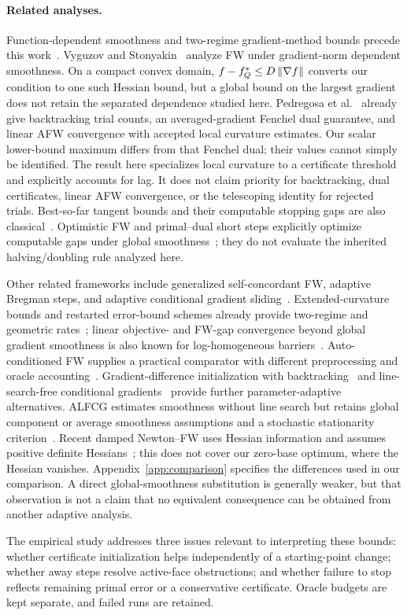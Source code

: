 \paragraph{Related analyses.}
Function-dependent smoothness and two-regime gradient-method bounds
precede this work~\cite{warmup,lobanovkoloskova,lobanov}.
Vyguzov and Stonyakin~\cite{vyguzov} analyze FW under gradient-norm
dependent smoothness. On a compact convex domain,
$f-f_Q^*\le D\left\|\nabla f\right\|$ converts our condition to one such Hessian
bound, but a global bound on the largest gradient does not retain the
separated dependence studied here.
Pedregosa et al.~\cite[Theorems 1, 3, and 4]{pedregosa} already give
backtracking trial counts, an averaged-gradient Fenchel dual guarantee,
and linear AFW convergence with accepted local curvature estimates.
Our scalar lower-bound maximum differs from that Fenchel dual; their
values cannot simply be identified. The result here specializes local
curvature to a certificate threshold and explicitly accounts for lag.
It does not claim priority for backtracking, dual certificates, linear
AFW convergence, or the telescoping identity for rejected trials.
Best-so-far tangent bounds and their computable stopping gaps are
also classical~\cite[Method 1]{freundgrigas}. Optimistic FW and
primal--dual short steps explicitly optimize computable gaps under
global smoothness~\cite[Proposition 4.1]{beyondshort}; they do not
evaluate the inherited halving/doubling rule analyzed here.

Other related frameworks include generalized self-concordant FW,
adaptive Bregman steps, and adaptive conditional gradient
sliding~\cite{selfconcordant,bregmanfw,adcgs}.
Extended-curvature bounds and restarted error-bound schemes already
provide two-regime and geometric rates~\cite{wirth,restartfw};
linear objective- and FW-gap convergence beyond global gradient
smoothness is also known for log-homogeneous barriers~\cite{zhao}.
Auto-conditioned FW supplies a practical comparator with different
preprocessing and oracle accounting~\cite{autoconditioned}.
Gradient-difference initialization with backtracking~\cite{khademi}
and line-search-free conditional gradients~\cite{yagishita}
provide further parameter-adaptive alternatives.
ALFCG estimates smoothness without line search but retains global
component or average smoothness assumptions and a stochastic
stationarity criterion~\cite[Section 3]{alfcg}.
Recent damped Newton--FW uses Hessian information and assumes positive
definite Hessians~\cite[Section 1]{newtonfw}; this does not cover our
zero-base optimum, where the Hessian vanishes.
Appendix~\ref{app:comparison} specifies the differences used in our
comparison. A direct global-smoothness substitution is generally weaker,
but that observation is not a claim that no equivalent consequence
can be obtained from another adaptive analysis.

The empirical study addresses three issues relevant to interpreting
these bounds: whether certificate initialization helps independently of
a starting-point change; whether away steps resolve active-face
obstructions; and whether failure to stop reflects remaining primal
error or a conservative certificate. Oracle budgets are kept separate,
and failed runs are retained.
